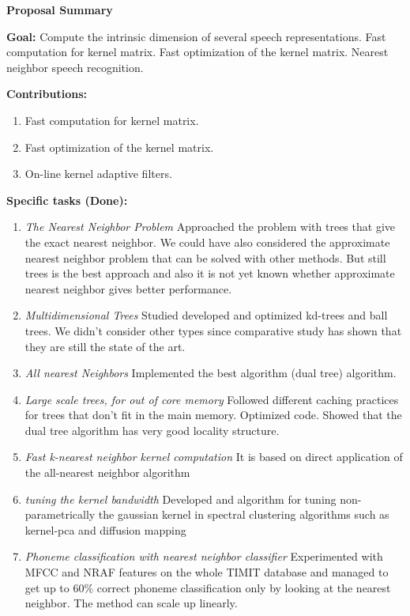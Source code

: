 \documentclass[12pt]{article}
\begin{document}
\pagestyle{plain}
\begin{center}
    \textbf{Proposal Summary}
\end{center}

\textbf{Goal:} Compute the intrinsic dimension of several speech
representations. Fast computation for kernel matrix. Fast
optimization of the kernel matrix. Nearest neighbor speech
recognition.

\textbf{Contributions:}
\begin{enumerate}
  \item Fast computation for kernel matrix.
  \item Fast optimization of the kernel matrix.
  \item On-line kernel adaptive filters.
\end{enumerate}

\textbf{Specific tasks (Done):}
\begin{enumerate}
  \item \textit{The Nearest Neighbor Problem} Approached the problem
  with trees that give the exact nearest neighbor. We could have also
  considered the approximate nearest neighbor problem that can be
  solved with other methods. But still trees is the best approach
  and also it is not yet known whether approximate nearest neighbor
  gives better performance.
  \item \textit{Multidimensional Trees} Studied developed and
  optimized kd-trees and ball trees. We didn't consider other types
  since comparative study has shown that they are still the state of
  the art.
  \item \textit{All nearest Neighbors} Implemented the best
  algorithm (dual tree) algorithm.
  \item \textit{Large scale trees, for out of core memory} Followed
  different caching practices for trees that don't fit in the main
  memory. Optimized code. Showed that the dual tree algorithm has
  very good locality structure.
  \item \textit{Fast k-nearest neighbor kernel computation} It is
  based on direct application of the all-nearest neighbor algorithm
  \item \textit{tuning the kernel bandwidth} Developed and algorithm
  for tuning non-parametrically the gaussian kernel in spectral
  clustering algorithms such as kernel-pca and diffusion mapping
  \item \textit{Phoneme classification with nearest neighbor
  classifier} Experimented with MFCC and NRAF features on the whole
  TIMIT database and managed to get up to 60\% correct phoneme
  classification only by looking at the nearest neighbor. The method
  can scale up linearly.
\end{enumerate}
\end{document}
